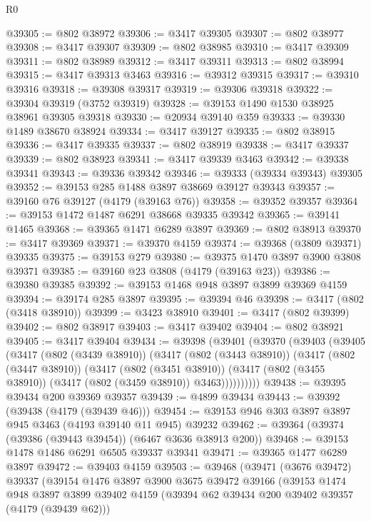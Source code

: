 \begin{lexlean}{R0}
\begin{coremodule}
@39305 := @802 @38972
@39306 := @3417 @39305
@39307 := @802 @38977
@39308 := @3417 @39307
@39309 := @802 @38985
@39310 := @3417 @39309
@39311 := @802 @38989
@39312 := @3417 @39311
@39313 := @802 @38994
@39315 := @3417 @39313 @3463
@39316 := @39312 @39315
@39317 := @39310 @39316
@39318 := @39308 @39317
@39319 := @39306 @39318
@39322 := @39304 @39319 (@3752 @39319)
@39328 := @39153 @1490 @1530 @38925 @38961 @39305 @39318
@39330 := @20934 @39140 @359
@39333 := @39330 @1489 @38670 @38924
@39334 := @3417 @39127
@39335 := @802 @38915
@39336 := @3417 @39335
@39337 := @802 @38919
@39338 := @3417 @39337
@39339 := @802 @38923
@39341 := @3417 @39339 @3463
@39342 := @39338 @39341
@39343 := @39336 @39342
@39346 := @39333 (@39334 @39343) @39305
@39352 := @39153 @285 @1488 @3897 @38669 @39127 @39343
@39357 := @39160 @76 @39127 (@4179 (@39163 @76))
@39358 := @39352 @39357
@39364 := @39153 @1472 @1487 @6291 @38668 @39335 @39342
@39365 := @39141 @1465
@39368 := @39365 @1471 @6289 @3897
@39369 := @802 @38913
@39370 := @3417 @39369
@39371 := @39370 @4159
@39374 := @39368 (@3809 @39371) @39335
@39375 := @39153 @279
@39380 := @39375 @1470 @3897 @3900 @3808 @39371
@39385 := @39160 @23 @3808 (@4179 (@39163 @23))
@39386 := @39380 @39385
@39392 := @39153 @1468 @948 @3897 @3899 @39369 @4159
@39394 := @39174 @285 @3897
@39395 := @39394 @46
@39398 := @3417 (@802 (@3418 @38910))
@39399 := @3423 @38910
@39401 := @3417 (@802 @39399)
@39402 := @802 @38917
@39403 := @3417 @39402
@39404 := @802 @38921
@39405 := @3417 @39404
@39434 := @39398
    (@39401
      (@39370
        (@39403
          (@39405
            (@3417
              (@802 (@3439 @38910))
              (@3417
                (@802 (@3443 @38910))
                (@3417
                  (@802 (@3447 @38910))
                  (@3417
                    (@802 (@3451 @38910))
                    (@3417 (@802 (@3455 @38910)) (@3417 (@802 (@3459 @38910)) @3463))))))))))
@39438 := @39395 @39434 @200 @39369 @39357
@39439 := @4899 @39434
@39443 := @39392 (@39438 (@4179 (@39439 @46)))
@39454 := @39153 @946 @303 @3897 @3897 @945 @3463 (@4193 @39140 @11 @945) @39232
@39462 := @39364 (@39374 (@39386 (@39443 @39454)) (@6467 @3636 @38913 @200))
@39468 := @39153 @1478 @1486 @6291 @6505 @39337 @39341
@39471 := @39365 @1477 @6289 @3897
@39472 := @39403 @4159
@39503 := @39468
    (@39471
      (@3676 @39472)
      @39337
      (@39154
        @1476
        @3897
        @3900
        @3675
        @39472
        @39166
        (@39153
          @1474
          @948
          @3897
          @3899
          @39402
          @4159
          (@39394 @62 @39434 @200 @39402 @39357 (@4179 (@39439 @62)))

\end{coremodule}
\end{lexlean}
